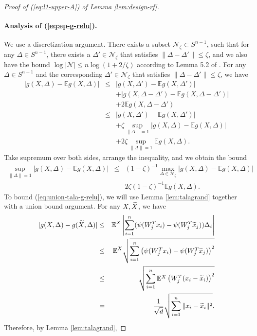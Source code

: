 \begin{proof}[Proof of (\ref{eq:l1-upper-A}) of Lemma \ref{lem:design-rf}]
\paragraph{Analysis of (\ref{eq:ep-g-relu}).} We use a discretization argument. There exists a subset $\mathcal{N}_{\zeta}\subset S^{n-1}$, such that for any $\Delta\in S^{n-1}$, there exists a $\Delta'\in\mathcal{N}_{\zeta}$ that satisfies $\|\Delta-\Delta'\|\leq\zeta$, and we also have the bound $\log|\mathcal{N}|\leq n\log\left(1+2/\zeta\right)$ according to Lemma 5.2 of \cite{vershynin2010introduction}. For any $\Delta\in S^{n-1}$ and the corresponding $\Delta'\in\mathcal{N}_{\zeta}$ that satisfies $\|\Delta-\Delta'\|\leq \zeta$, we have
\begin{eqnarray*}
|g(X,\Delta) - \mathbb{E}g(X,\Delta)| &\leq& |g(X,\Delta')-\mathbb{E}g(X,\Delta')| \\
&& + |g(X,\Delta-\Delta')-\mathbb{E}g(X,\Delta-\Delta')|  \\
&& + 2\mathbb{E}g(X,\Delta-\Delta') \\
&\leq& |g(X,\Delta')-\mathbb{E}g(X,\Delta')| \\
&& + \zeta\sup_{\|\Delta\|=1}|g(X,\Delta)-\mathbb{E}g(X,\Delta)|  \\
&& + 2\zeta\sup_{\|\Delta\|=1}\mathbb{E}g(X,\Delta).
\end{eqnarray*}
Take supremum over both sides, arrange the inequality, and we obtain the bound
\begin{eqnarray}
\label{eq:union-tala-g-relu} \sup_{\|\Delta\|=1}|g(X,\Delta) - \mathbb{E}g(X,\Delta)| &\leq& (1-\zeta)^{-1}\max_{\Delta\in\mathcal{N}_{\zeta}}|g(X,\Delta) - \mathbb{E}g(X,\Delta)| \\
\label{eq:small-exp-relu} && 2\zeta(1-\zeta)^{-1}\mathbb{E}g(X,\Delta).
\end{eqnarray}
To bound (\ref{eq:union-tala-g-relu}), we will use Lemma \ref{lem:talagrand} together with a union bound argument. For any $X,\widetilde{X}$, we have
\begin{eqnarray*}
|g(X,\Delta)-g(\wt{X},\Delta)| &\leq& \mathbb{E}^X\left|\sum_{i=1}^n(\psi(W_j^Tx_i)-\psi(W_j^T\wt{x}_j))\Delta_i\right| \\
&\leq& \mathbb{E}^X\sqrt{\sum_{i=1}^n\left(\psi(W_j^Tx_i)-\psi(W_j^T\wt{x}_j)\right)^2} \\
&\leq& \sqrt{\sum_{i=1}^n\mathbb{E}^X\left(W_j^T(x_i-\wt{x}_i)\right)^2} \\
&=& \frac{1}{\sqrt{d}}\sqrt{\sum_{i=1}^n\|x_i-\wt{x}_i\|^2}.
\end{eqnarray*}
Therefore, by Lemma \ref{lem:talagrand},

\end{proof}
